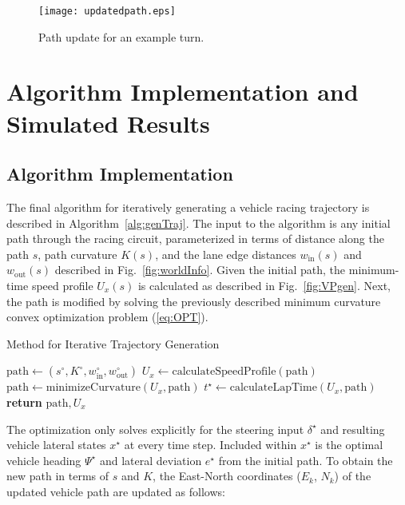 \documentclass[twocolumn,10pt]{asme2ej}
\begin{document}
\begin{figure}
\centering
\texttt{[image: updatedpath.eps]}
\caption{Path update for an example turn.}
\label{fig:hairpin}
\end{figure}
 
\section{Algorithm Implementation and Simulated Results}
\label{sec:IMPLEMENT}
\subsection{Algorithm Implementation}
The final algorithm for iteratively
generating a vehicle racing trajectory is described in Algorithm~\ref{alg:genTraj}. The input to the algorithm is any initial path through the racing circuit, 
parameterized in terms of distance along the path $s$, path curvature $K(s)$, and the lane edge distances $w_\mathrm{in}(s)$ and 
$w_\mathrm{out}(s)$ described in Fig.~\ref{fig:worldInfo}. Given the initial path, the minimum-time speed profile $U_x(s)$ is calculated as described in 
Fig.~\ref{fig:VPgen}. Next, the path is modified by solving the previously described minimum curvature
 convex optimization problem (\ref{eq:OPT}). 
 
 \begin{algorithm}
 \caption{Method for Iterative Trajectory Generation}
  \label{alg:genTraj}
\begin{algorithmic}[1]
\State $\mathrm{path}\gets (s^\circ, K^\circ, w_\mathrm{in}^\circ, w_\mathrm{out}^\circ)$
\State $U_x \gets \mathrm{calculateSpeedProfile(path)}$
\State $\mathrm{path} \gets \mathrm{minimizeCurvature}(U_x, \mathrm{path})$
\State $t^\star \gets \mathrm{calculateLapTime}(U_x,\mathrm{path})$
\EndWhile
\State \textbf{return} $\mathrm{path},U_x$
\EndProcedure
\end{algorithmic}
\end{algorithm}
 
The optimization only solves explicitly for the steering input $\delta^\star$ and resulting vehicle lateral states $x^\star$ at every 
time step. Included within $x^\star$  is the optimal vehicle heading $\Psi^\star$ and lateral deviation $e^\star$ from the initial path. To obtain 
the new path in terms of $s$ and $K$, the East-North coordinates ($E_k$, $N_k$) of the updated vehicle path are updated as follows:
	
\end{document}
